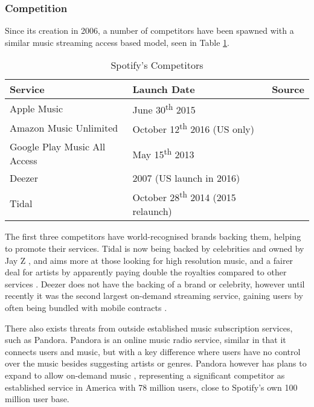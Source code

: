 \subsubsection{Competition}
Since its creation in 2006, a number of competitors have been spawned with a similar music streaming access based model, seen in Table \ref{table:competitors}.
\begin{table}[ht!]
\centering
 \begin{tabular}{|l|l|l|} 
 \hline
 \textbf{Service} & \textbf{Launch Date} & \textbf{Source} \\ [0.2ex] 
 \hline
 \small{Apple Music} & \small{June 30\textsuperscript{th} 2015} & \small{\parencite{apple_music_launch}} \\ 
 \hline
 \small{Amazon Music Unlimited} & \small{October 12\textsuperscript{th} 2016 (US only)} & \small{\parencite{amazon_music_launch}} \\
 \hline
 \small{Google Play Music All Access} & \small{May 15\textsuperscript{th} 2013} & \small{\parencite{google_music_all_access_launch}} \\
 \hline
 \small{Deezer} & \small{2007 (US launch in 2016)} & \small{\parencite{deezer_launch, deezer_us_launch}} \\
 \hline
 \small{Tidal} & \small{October 28\textsuperscript{th} 2014 (2015 relaunch)} & \small{\parencite{tidal_launch}} \\
 \hline
 \end{tabular}
 \caption{Spotify's Competitors}
 \label{table:competitors}
\end{table}
\par
The first three competitors have world-recognised brands backing them, helping to promote their services. Tidal is now being backed by celebrities and owned by Jay Z \parencite{tidal_launch_issues}, and aims more at those looking for high resolution music, and a fairer deal for artists by apparently paying double the royalties compared to other services \parencite{tidal_launch_issues}. Deezer does not have the backing of a brand or celebrity, however until recently it was the second largest on-demand streaming service, gaining users by often being bundled with mobile contracts \parencite{music_streaming_guardian}.
\par
There also exists threats from outside established music subscription services, such as Pandora. Pandora is an online music radio service, similar in that it connects users and music, but with a key difference where users have no control over the music besides suggesting artists or genres. Pandora however has plans to expand to allow on-demand music \parencite{pandora_subscription}, representing a significant competitor as established service in America with 78 million users, close to Spotify's own 100 million user base.